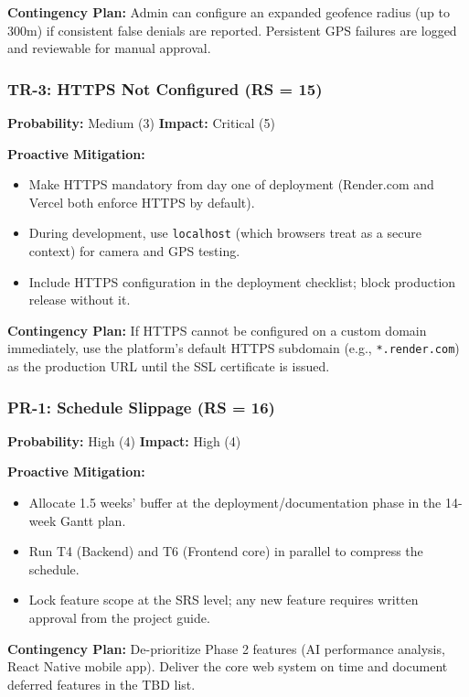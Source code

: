 \documentclass[12pt,a4paper]{article}
\begin{document}
\textbf{Contingency Plan:}
Admin can configure an expanded geofence radius (up to 300m) if consistent false denials are reported. Persistent GPS failures are logged and reviewable for manual approval.

\bigskip
\subsubsection*{TR-3: HTTPS Not Configured (RS = 15)}
\textbf{Probability:} Medium (3) \quad \textbf{Impact:} Critical (5)

\textbf{Proactive Mitigation:}
\begin{itemize}[noitemsep]
    \item Make HTTPS mandatory from day one of deployment (Render.com and Vercel both enforce HTTPS by default).
    \item During development, use \texttt{localhost} (which browsers treat as a secure context) for camera and GPS testing.
    \item Include HTTPS configuration in the deployment checklist; block production release without it.
\end{itemize}

\textbf{Contingency Plan:}
If HTTPS cannot be configured on a custom domain immediately, use the platform's default HTTPS subdomain (e.g., \texttt{*.render.com}) as the production URL until the SSL certificate is issued.

\bigskip
\subsubsection*{PR-1: Schedule Slippage (RS = 16)}
\textbf{Probability:} High (4) \quad \textbf{Impact:} High (4)

\textbf{Proactive Mitigation:}
\begin{itemize}[noitemsep]
    \item Allocate 1.5 weeks' buffer at the deployment/documentation phase in the 14-week Gantt plan.
    \item Run T4 (Backend) and T6 (Frontend core) in parallel to compress the schedule.
    \item Lock feature scope at the SRS level; any new feature requires written approval from the project guide.
\end{itemize}

\textbf{Contingency Plan:}
De-prioritize Phase 2 features (AI performance analysis, React Native mobile app). Deliver the core web system on time and document deferred features in the TBD list.
\end{document}
